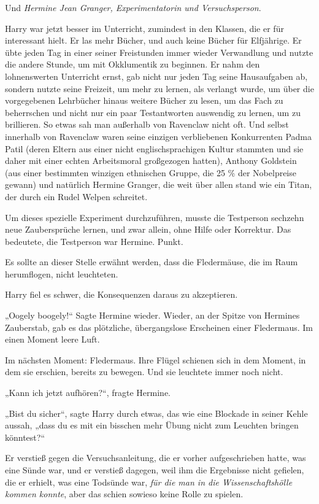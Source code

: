 {Und \emph{Hermine Jean Granger, Experimentatorin und Versuchsperson}.

Harry war jetzt besser im Unterricht, zumindest in den Klassen, die er für interessant hielt. Er las mehr Bücher, und auch keine Bücher für Elfjährige. Er übte jeden Tag in einer seiner Freistunden immer wieder Verwandlung und nutzte die andere Stunde, um mit Okklumentik zu beginnen. Er nahm den lohnenswerten Unterricht ernst, gab nicht nur jeden Tag seine Hausaufgaben ab, sondern nutzte seine Freizeit, um mehr zu lernen, als verlangt wurde, um über die vorgegebenen Lehrbücher hinaus weitere Bücher zu lesen, um das Fach zu beherrschen und nicht nur ein paar Testantworten auswendig zu lernen, um zu brillieren. So etwas sah man außerhalb von Ravenclaw nicht oft. Und selbst innerhalb von Ravenclaw waren seine einzigen verbliebenen Konkurrenten Padma Patil (deren Eltern aus einer nicht englischsprachigen Kultur stammten und sie daher mit einer echten Arbeitsmoral großgezogen hatten), Anthony Goldstein (aus einer bestimmten winzigen ethnischen Gruppe, die 25 \% der Nobelpreise gewann) und natürlich Hermine Granger, die weit über allen stand wie ein Titan, der durch ein Rudel Welpen schreitet.

Um dieses spezielle Experiment durchzuführen, musste die Testperson sechzehn neue Zaubersprüche lernen, und zwar allein, ohne Hilfe oder Korrektur. Das bedeutete, die Testperson war Hermine. Punkt.

Es sollte an dieser Stelle erwähnt werden, dass die Fledermäuse, die im Raum herumflogen, nicht leuchteten.

Harry fiel es schwer, die Konsequenzen daraus zu akzeptieren.

„Oogely boogely!“ Sagte Hermine wieder. Wieder, an der Spitze von Hermines Zauberstab, gab es das plötzliche, übergangslose Erscheinen einer Fledermaus. Im einen Moment leere Luft.

Im nächsten Moment: Fledermaus. Ihre Flügel schienen sich in dem Moment, in dem sie erschien, bereits zu bewegen. Und sie leuchtete immer noch nicht.

„Kann ich jetzt aufhören?“, fragte Hermine.

„Bist du sicher“, sagte Harry durch etwas, das wie eine Blockade in seiner Kehle aussah, „dass du es mit ein bisschen mehr Übung nicht zum Leuchten bringen könntest?“

Er verstieß gegen die Versuchsanleitung, die er vorher aufgeschrieben hatte, was eine Sünde war, und er verstieß dagegen, weil ihm die Ergebnisse nicht gefielen, die er erhielt, was eine Todsünde war, \emph{für die man in die Wissenschaftshölle kommen konnte}, aber das schien sowieso keine Rolle zu spielen.

}
